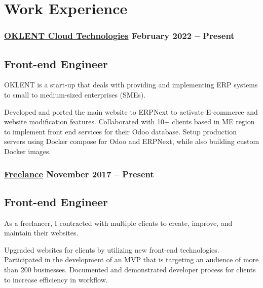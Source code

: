 \section*{Work Experience}
%
%
%
\medskip
\subsubsection*{
  \href{https://oklent.com/}{OKLENT Cloud Technologies}
  \hspace*{\fill}
  February 2022 -- Present
}
\subsection*{Front-end Engineer}
OKLENT is a start-up that deals with providing and implementing ERP systems to small to medium-sized enterprises (SMEs).\smallskip
\smallskip
\begin{tasks}
  \task Developed and ported the main website to ERPNext to activate E-commerce and website modification features.
  \task Collaborated with 10+ clients based in ME region to implement front end services for their Odoo database.
  \task Setup production servers using Docker compose for Odoo and ERPNext, while also building custom Docker images.
\end{tasks}
%
%
\medskip
\subsubsection*{
  \href{https://bumbleboss.xyz/}{Freelance}
  \hspace*{\fill}
  November 2017 -- Present
}
\subsection*{Front-end Engineer}
As a freelancer, I contracted with multiple clients to create, improve, and maintain their websites.
\smallskip
\begin{tasks}
  \task Upgraded websites for clients by utilizing new front-end technologies.
  \task Participated in the development of an MVP that is targeting an audience of more than 200 businesses.
  \task Documented and demonstrated developer process for clients to increase efficiency in workflow.
\end{tasks}
